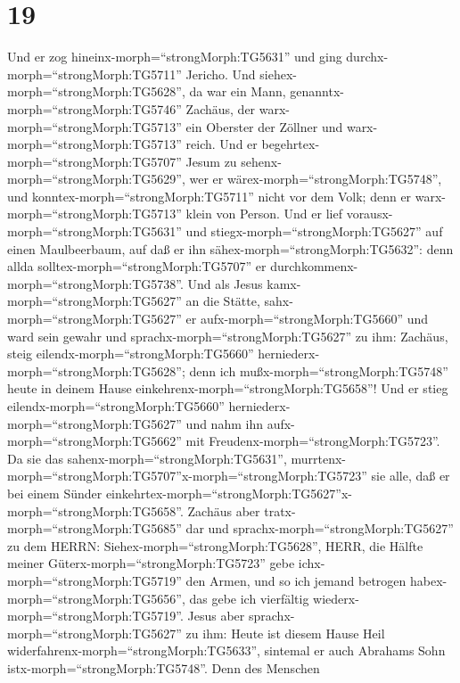 \hypertarget{section-18}{%
\section{19}\label{section-18}}

 Und er zog hineinx-morph=``strongMorph:TG5631'' und ging
durchx-morph=``strongMorph:TG5711'' Jericho.  Und
siehex-morph=``strongMorph:TG5628'', da war ein Mann,
genanntx-morph=``strongMorph:TG5746'' Zachäus, der
warx-morph=``strongMorph:TG5713'' ein Oberster der Zöllner und
warx-morph=``strongMorph:TG5713'' reich.  Und er
begehrtex-morph=``strongMorph:TG5707'' Jesum zu
sehenx-morph=``strongMorph:TG5629'', wer er
wärex-morph=``strongMorph:TG5748'', und
konntex-morph=``strongMorph:TG5711'' nicht vor dem Volk; denn er
warx-morph=``strongMorph:TG5713'' klein von Person.  Und er
lief vorausx-morph=``strongMorph:TG5631'' und
stiegx-morph=``strongMorph:TG5627'' auf einen Maulbeerbaum, auf daß er
ihn sähex-morph=``strongMorph:TG5632'': denn allda
solltex-morph=``strongMorph:TG5707'' er
durchkommenx-morph=``strongMorph:TG5738''.  Und als Jesus
kamx-morph=``strongMorph:TG5627'' an die Stätte,
sahx-morph=``strongMorph:TG5627'' er aufx-morph=``strongMorph:TG5660''
und ward sein gewahr und sprachx-morph=``strongMorph:TG5627'' zu ihm:
Zachäus, steig eilendx-morph=``strongMorph:TG5660''
herniederx-morph=``strongMorph:TG5628''; denn ich
mußx-morph=``strongMorph:TG5748'' heute in deinem Hause
einkehrenx-morph=``strongMorph:TG5658''!  Und er stieg
eilendx-morph=``strongMorph:TG5660''
herniederx-morph=``strongMorph:TG5627'' und nahm ihn
aufx-morph=``strongMorph:TG5662'' mit
Freudenx-morph=``strongMorph:TG5723''.  Da sie das
sahenx-morph=``strongMorph:TG5631'',
murrtenx-morph=``strongMorph:TG5707''x-morph=``strongMorph:TG5723'' sie
alle, daß er bei einem Sünder
einkehrtex-morph=``strongMorph:TG5627''x-morph=``strongMorph:TG5658''.
 Zachäus aber tratx-morph=``strongMorph:TG5685'' dar und
sprachx-morph=``strongMorph:TG5627'' zu dem HERRN:
Siehex-morph=``strongMorph:TG5628'', HERR, die Hälfte meiner
Güterx-morph=``strongMorph:TG5723'' gebe
ichx-morph=``strongMorph:TG5719'' den Armen, und so ich jemand betrogen
habex-morph=``strongMorph:TG5656'', das gebe ich vierfältig
wiederx-morph=``strongMorph:TG5719''.  Jesus aber
sprachx-morph=``strongMorph:TG5627'' zu ihm: Heute ist diesem Hause Heil
widerfahrenx-morph=``strongMorph:TG5633'', sintemal er auch Abrahams
Sohn istx-morph=``strongMorph:TG5748''.  Denn des Menschen

